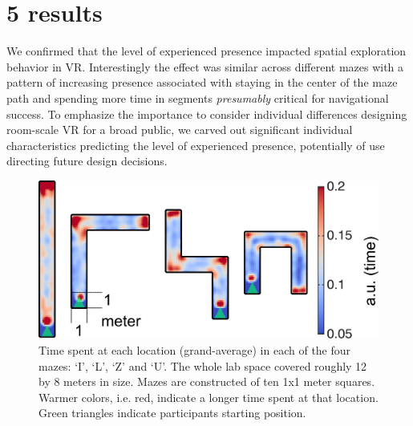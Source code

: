 \section{5 results}
We confirmed that the level of experienced presence impacted spatial exploration behavior in VR. Interestingly the effect was similar across different mazes with a pattern of increasing presence associated with staying in the center of the maze path and spending more time in segments \textit{presumably} critical for navigational success. To emphasize the importance to consider individual differences designing room-scale VR for a broad public, we carved out significant individual characteristics predicting the level of experienced presence, potentially of use directing future design decisions.

\begin{figure}[!t]
\centering
\includegraphics[width=\linewidth]{figures/head_loc_mean2.pdf}
\vspace{6pt}
\caption{Time spent at each location (grand-average) in each of the four mazes: `I', `L', `Z' and `U'. The whole lab space covered roughly 12 by 8 meters in size. Mazes are constructed of ten 1x1 meter squares. Warmer colors, i.e. red, indicate a longer time spent at that location. Green triangles indicate participants starting position.}
\label{head_loc_mean}
\end{figure}